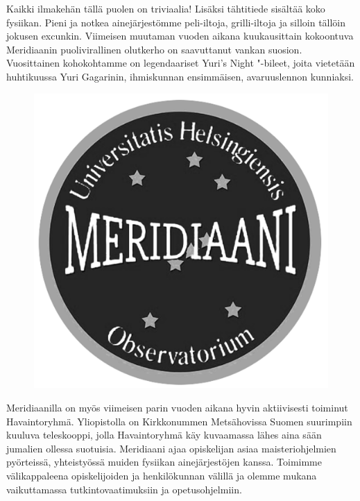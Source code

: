 \documentclass[a5paper, 8pt, twocolumn]{book} %
\numberwithin{equation}{section}
\begin{document}
Kaikki ilmakehän tällä puolen on triviaalia!
Lisäksi tähtitiede sisältää koko fysiikan.
Pieni ja notkea ainejärjestömme
peli-iltoja, grilli-iltoja ja silloin tällöin
jokusen excunkin. Viimeisen muutaman
vuoden aikana kuukausittain kokoontuva
Meridiaanin puolivirallinen olutkerho
on saavuttanut vankan suosion. Vuosittainen
kohokohtamme on legendaariset
Yuri's Night "-bileet, joita vietetään huhtikuussa
Yuri Gagarinin, ihmiskunnan
ensimmäisen, avaruuslennon kunniaksi.
\begin{figure}[!b]
	\centering
	\includegraphics[width=\columnwidth]{meridiaani.png}
\end{figure}

Meridiaanilla on myös viimeisen parin
vuoden aikana hyvin aktiivisesti toiminut
Havaintoryhmä. Yliopistolla on
Kirkkonummen Metsähovissa Suomen
suurimpiin kuuluva teleskooppi, jolla
Havaintoryhmä käy kuvaamassa lähes
aina sään jumalien ollessa suotuisia.
Meridiaani ajaa opiskelijan asiaa maisteriohjelmien
pyörteissä, yhteistyössä muiden
fysiikan ainejärjestöjen
kanssa. Toimimme välikappaleena opiskelijoiden
ja henkilökunnan välillä ja
olemme mukana vaikuttamassa tutkintovaatimuksiin
ja opetusohjelmiin.
\end{document}
